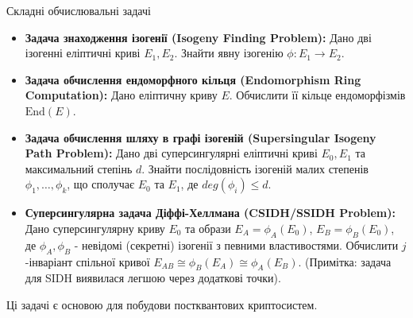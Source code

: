 \documentclass[9pt]{beamer}
\begin{document}
\begin{darkframes}
\begin{frame}{Складні обчислювальні задачі}
  \begin{itemize}
    \item \textbf{Задача знаходження ізогенії (Isogeny Finding Problem):}
      Дано дві ізогенні еліптичні криві $E_1, E_2$. Знайти явну ізогенію $\phi: E_1 \to E_2$.
    \item \textbf{Задача обчислення ендоморфного кільця (Endomorphism Ring Computation):}
      Дано еліптичну криву $E$. Обчислити її кільце ендоморфізмів $\text{End}(E)$.
    \item \textbf{Задача обчислення шляху в графі ізогеній (Supersingular Isogeny Path Problem):}
      Дано дві суперсингулярні еліптичні криві $E_0, E_1$ та максимальний степінь $d$. Знайти послідовність ізогеній малих степенів $\phi_1, \dots, \phi_k$, що сполучає $E_0$ та $E_1$, де $deg(\phi_i) \le d$.
    \item \textbf{Суперсингулярна задача Діффі-Хеллмана (CSIDH/SSIDH Problem):}
      Дано суперсингулярну криву $E_0$ та образи $E_A = \phi_A(E_0)$, $E_B = \phi_B(E_0)$, де $\phi_A, \phi_B$ - невідомі (секретні) ізогенії з певними властивостями. Обчислити $j$-інваріант спільної кривої $E_{AB} \cong \phi_B(E_A) \cong \phi_A(E_B)$. (Примітка: задача для SIDH виявилася легшою через додаткові точки).
  \end{itemize}
  Ці задачі є основою для побудови постквантових криптосистем.
\end{frame}



\end{darkframes}
\end{document}
